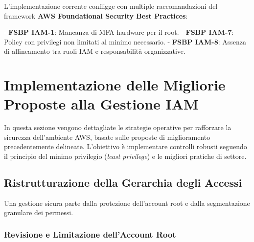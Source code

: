 L'implementazione corrente confligge con multiple raccomandazioni del framework \textbf{AWS Foundational Security Best Practices}:

- \textbf{FSBP IAM-1}: Mancanza di MFA hardware per il root\cite{ref3}.
- \textbf{FSBP IAM-7}: Policy con privilegi non limitati al minimo necessario\cite{ref5}.
- \textbf{FSBP IAM-8}: Assenza di allineamento tra ruoli IAM e responsabilità organizzative\cite{ref2}.




\section{Implementazione delle Migliorie Proposte alla Gestione IAM}
\label{sec:implementazione_migliorie}

In questa sezione vengono dettagliate le strategie operative per rafforzare la sicurezza dell'ambiente AWS, basate sulle proposte di miglioramento precedentemente delineate. L'obiettivo è implementare controlli robusti seguendo il principio del minimo privilegio (\emph{least privilege}) e le migliori pratiche di settore.

\subsection{Ristrutturazione della Gerarchia degli Accessi}

Una gestione sicura parte dalla protezione dell'account root e dalla segmentazione granulare dei permessi.

\subsubsection{Revisione e Limitazione dell'Account Root}

